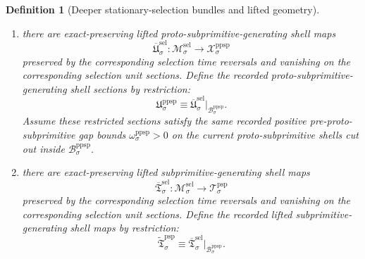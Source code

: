 \documentclass[11pt]{article}
\newcommand{\ProtoSubprimTarget}[1]{\mathcal T_{#1}^{\mathrm{psp}}}
\newcommand{\PreProtoSubprimTarget}[1]{\mathcal X_{#1}^{\mathrm{ppsp}}}
\newcommand{\PreProtoSubprimGap}[1]{\omega_{#1}^{\mathrm{ppsp}}}
\newcommand{\PreProtoSubprimSpace}[1]{\mathcal B_{#1}^{\mathrm{ppsp}}}
\newcommand{\PreProtoSubprimSection}[1]{\mathfrak U_{#1}^{\mathrm{ppsp}}}
\newcommand{\PreProtoSubprimInc}[1]{\iota_{#1}^{\mathrm{ppsp}}}
\newcommand{\PreProtoSubprimLiftedSubprimitive}[1]{\widetilde{\mathfrak T}_{#1}^{\mathrm{psp}}}
\newcommand{\SelSpace}[1]{\mathcal M_{#1}^{\mathrm{sel}}}
\newcommand{\SelMetric}[1]{S_{#1}^{\mathrm{sel}}}
\newcommand{\SelTargetMetric}[1]{r_{#1}^{\mathrm{sel}}}
\newcommand{\SelGap}[1]{\zeta_{#1}^{\mathrm{sel}}}
\newcommand{\SelSection}[1]{\mathfrak M_{#1}^{\mathrm{sel}}}
\newcommand{\SelFunctional}[1]{\mathscr S_{#1}^{\mathrm{sel}}}
\newcommand{\SelLiftedPreProto}[1]{\overline{\mathfrak U}_{#1}^{\mathrm{sel}}}
\newcommand{\SelLiftedSubprimitive}[1]{\overline{\mathfrak T}_{#1}^{\mathrm{sel}}}
\newtheorem{definition}{Definition}
\begin{document}
\begin{definition}[Deeper stationary-selection bundles and lifted geometry]
\begin{enumerate}
    and let
    \begin{equation}
    \PreProtoSubprimInc{\sigma}:\PreProtoSubprimSpace{\sigma}\hookrightarrow \SelSpace{\sigma}
    \label{eq:preproto_inclusion}
    \end{equation}
    be the shell inclusion. Assume this shell is a closed embedded \(C^2\) submanifold, invariant under the corresponding selection time reversal, containing the image of the corresponding selection unit section, and equal to the exact set of global minima of \(\SelFunctional{\sigma}\). Assume further that, for every \(x\in\PreProtoSubprimSpace{\sigma}\),
    \begin{equation}
    \SelTargetMetric{\sigma}\!\left(
    D\SelSection{\sigma}(x)\xi,
    D\SelSection{\sigma}(x)\xi
    \right)
    \ge
    \SelGap{\sigma}\,
    \SelMetric{\sigma}(\xi,\xi),
    \qquad
    \SelGap{\sigma}>0,
    \label{eq:selection_gap}
    \end{equation}
    for all \(\xi\) orthogonal, with respect to \(\SelMetric{\sigma}\), to \(T_x\PreProtoSubprimSpace{\sigma}\).
    \item there are exact-preserving lifted proto-subprimitive-generating shell maps
    \[
    \SelLiftedPreProto{\sigma}:\SelSpace{\sigma}\to\PreProtoSubprimTarget{\sigma}
    \]
    preserved by the corresponding selection time reversals and vanishing on the corresponding selection unit sections. Define the recorded proto-subprimitive-generating shell sections by restriction:
    \begin{equation}
    \PreProtoSubprimSection{\sigma}\equiv \SelLiftedPreProto{\sigma}|_{\PreProtoSubprimSpace{\sigma}}.
    \label{eq:preproto_section_from_selection}
    \end{equation}
    Assume these restricted sections satisfy the same recorded positive pre-proto-subprimitive gap bounds \(\PreProtoSubprimGap{\sigma}>0\) on the current proto-subprimitive shells cut out inside \(\PreProtoSubprimSpace{\sigma}\).
    \item there are exact-preserving lifted subprimitive-generating shell maps
    \[
    \SelLiftedSubprimitive{\sigma}:\SelSpace{\sigma}\to\ProtoSubprimTarget{\sigma}
    \]
    preserved by the corresponding selection time reversals and vanishing on the corresponding selection unit sections. Define the recorded lifted subprimitive-generating shell maps by restriction:
    \begin{equation}
    \PreProtoSubprimLiftedSubprimitive{\sigma}\equiv \SelLiftedSubprimitive{\sigma}|_{\PreProtoSubprimSpace{\sigma}}.

\end{equation}
\end{enumerate}
\end{definition}
\end{document}
